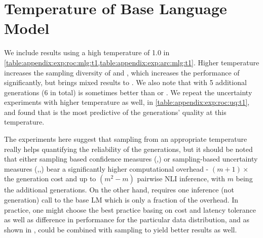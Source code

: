 
\section{Temperature of Base Language Model}\label{appendix:temperature}

We include results using a high temperature of 1.0 in \cref{table:appendix:exp:roc:mlg:t1,table:appendix:exp:arc:mlg:t1}.
Higher temperature increases the sampling diversity of \baselineDegree and \baselinePTrue, which increases the performance of \baselineDegree significantly, but brings mixed results to \baselinePTrue.
We also note that with 5 additional generations (6 in total) \baselineDegree is sometimes better than \methodnamePrompt or \methodnameNext.
We repeat the uncertainty experiments with higher temperature as well, in \cref{table:appendix:exp:roc:uq:t1}, and found that \methodSEAttn is the most predictive of the generations' quality at this temperature.

The experiments here suggest that sampling from an appropriate temperature really helps quantifying the reliability of the generations, but it should be noted that either sampling based confidence measures (\baselineDegree,\baselinePTrue) or sampling-based uncertainty measures (\baselineSENorm,\baselineSE,\methodSEAttn) bear a significantly higher computational overhead - $(m+1)\times$ the generation cost and up to $(m^2-m)$ pairwise NLI inference, with $m$ being the additional generations.
On the other hand, \methodname requires one inference (not generation) call to the base LM which is only a fraction of the overhead.
In practice, one might choose the best practice basing on cost and latency tolerance as well as difference in performance for the particular data distribution, and as shown in \methodSEAttn, \methodname could be combined with sampling to yield better results as well.


